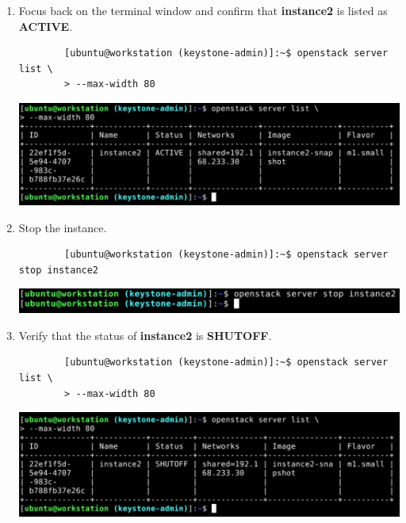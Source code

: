 \documentclass[letterpaper, 12pt]{article}
\begin{document}
\begin{enumerate}
    \item Focus back on the terminal window and confirm that \textbf{instance2} is listed as \textbf{ACTIVE}.
    \begin{lstlisting}
        [ubuntu@workstation (keystone-admin)]:~$ openstack server list \
        > --max-width 80
    \end{lstlisting}

    \begin{center}
        \includegraphics[width=\linewidth]{images/part4/step16.png}
    \end{center}

    \item Stop the instance.
    \begin{lstlisting}
        [ubuntu@workstation (keystone-admin)]:~$ openstack server stop instance2
    \end{lstlisting}

    \begin{center}
        \includegraphics[width=\linewidth]{images/part4/step17.png}
    \end{center}

    \item Verify that the status of \textbf{instance2} is \textbf{SHUTOFF}.
    \begin{lstlisting}
        [ubuntu@workstation (keystone-admin)]:~$ openstack server list \
        > --max-width 80
    \end{lstlisting}

    \begin{center}
        \includegraphics[width=\linewidth]{images/part4/step18.png}
    \end{center}


\end{enumerate}
\end{document}
